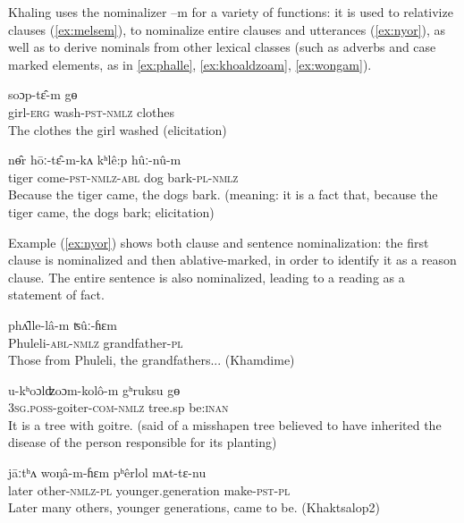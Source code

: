 \documentclass[oldfontcommands,oneside,a4paper,11pt]{article}
\newcommand{\ipa}[1]{{\phon \mbox{#1}}} %
\begin{document}

Khaling uses the nominalizer \ipa{--m} for a variety of functions: it is used to relativize clauses (\ref{ex:melsem}), to nominalize entire clauses and utterances (\ref{ex:nyor}), as well as to derive nominals from other lexical classes (such as adverbs and case marked elements, as in \ref{ex:phalle}, \ref{ex:khoaldzoam}, \ref{ex:wongam}).

\begin{exe}
\ex \label{ex:melsem}
\gll 	\ipa{melsêm-ʔɛ}  	\ipa{soɔp-tɛ̂-m}  	\ipa{gɵ}  	 \\
girl-\textsc{erg} wash-\textsc{pst}-\textsc{nmlz} clothes \\
\glt The clothes the girl washed (elicitation)
\end{exe}
\begin{exe}
\ex \label{ex:nyor}
\gll 
\ipa{nɵ̂r}  	\ipa{hōː-tɛ̂-m-kʌ}  	\ipa{kʰlê:p}  	\ipa{hûː-nû-m}  	\\
tiger come-\textsc{pst-nmlz-abl} dog bark-\textsc{pl-nmlz} \\
\glt Because the tiger came, the dogs bark. (meaning: it is a fact that, because the tiger came, the dogs bark; elicitation)
\end{exe}


Example (\ref{ex:nyor}) shows both clause and sentence nominalization: the first clause is nominalized and then ablative-marked, in order to identify it as a reason clause.  The entire sentence is also nominalized, leading to a reading as a statement of fact.
\begin{exe}
\ex \label{ex:phalle}
\gll 
\ipa{phʌ̂lle-lâ-m}  	\ipa{ʦûː-ɦɛm}  \\
Phuleli-\textsc{abl-nmlz} grandfather-\textsc{pl} \\
\glt Those from Phuleli, the grandfathers... (Khamdime)
\end{exe}

\begin{exe}
\ex \label{ex:khoaldzoam}
\gll 
  \ipa{u-kʰoɔlʣoɔm-kolô-m}  	\ipa{gʰruksu}  	\ipa{gɵ}  \\
\textsc{3sg.poss}-goiter-\textsc{com-nmlz} tree.sp be:\textsc{inan} \\
\glt It is a tree with goitre. (said of a misshapen tree believed to have inherited the disease of the person responsible for its planting)
\end{exe}
 \begin{exe}
\ex \label{ex:wongam}
\gll 
 \ipa{jāːtʰʌ}  	\ipa{woŋâ-m-ɦɛm}  	\ipa{pʰêrlol}  	\ipa{mʌt-tɛ-nu}  \\
later other-\textsc{nmlz-pl} younger.generation make-\textsc{pst-pl} \\
\glt Later many others, younger generations, came to be. (Khaktsalop2)
\end{exe}
\end{document}
